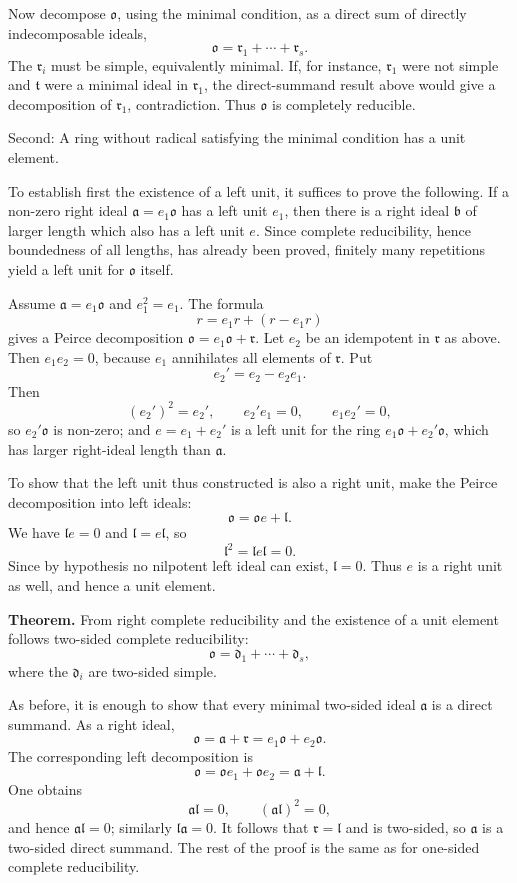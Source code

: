 \documentclass[11pt]{article}
\begin{document}
Now decompose \(\mathfrak{o}\), using the minimal condition, as a direct
sum of directly indecomposable ideals, \[
  \mathfrak{o}=\mathfrak r_1+\cdots+\mathfrak r_s.
\] The \(\mathfrak r_i\) must be simple, equivalently minimal. If, for
instance, \(\mathfrak r_1\) were not simple and \(\mathfrak t\) were a
minimal ideal in \(\mathfrak r_1\), the direct-summand result above
would give a decomposition of \(\mathfrak r_1\), contradiction. Thus
\(\mathfrak{o}\) is completely reducible.

Second: A ring without radical satisfying the minimal condition has a
unit element.

To establish first the existence of a left unit, it suffices to prove
the following. If a non-zero right ideal \(\mathfrak a=e_1\mathfrak{o}\)
has a left unit \(e_1\), then there is a right ideal \(\mathfrak b\) of
larger length which also has a left unit \(e\). Since complete
reducibility, hence boundedness of all lengths, has already been proved,
finitely many repetitions yield a left unit for \(\mathfrak{o}\) itself.

Assume \(\mathfrak a=e_1\mathfrak{o}\) and \(e_1^2=e_1\). The formula \[
  r=e_1r+(r-e_1r)
\] gives a Peirce decomposition
\(\mathfrak{o}=e_1\mathfrak{o}+\mathfrak r\). Let \(e_2\) be an
idempotent in \(\mathfrak r\) as above. Then \(e_1e_2=0\), because
\(e_1\) annihilates all elements of \(\mathfrak r\). Put \[
  e_2'=e_2-e_2e_1.
\] Then \[
  (e_2')^2=e_2',
  \qquad
  e_2'e_1=0,
  \qquad
  e_1e_2'=0,
\] so \(e_2'\mathfrak{o}\) is non-zero; and \(e=e_1+e_2'\) is a left
unit for the ring \(e_1\mathfrak{o}+e_2'\mathfrak{o}\), which has larger
right-ideal length than \(\mathfrak a\).

To show that the left unit thus constructed is also a right unit, make
the Peirce decomposition into left ideals: \[
  \mathfrak{o}=\mathfrak{o}e+\mathfrak l.
\] We have \(\mathfrak l e=0\) and \(\mathfrak l=e\mathfrak l\), so \[
  \mathfrak l^2=\mathfrak l e\mathfrak l=0.
\] Since by hypothesis no nilpotent left ideal can exist,
\(\mathfrak l=0\). Thus \(e\) is a right unit as well, and hence a unit
element.

\textbf{Theorem.} From right complete reducibility and the existence of
a unit element follows two-sided complete reducibility: \[
  \mathfrak{o}=\mathfrak d_1+\cdots+\mathfrak d_s,
\] where the \(\mathfrak d_i\) are two-sided simple.

As before, it is enough to show that every minimal two-sided ideal
\(\mathfrak a\) is a direct summand. As a right ideal, \[
  \mathfrak{o}=\mathfrak a+\mathfrak r=e_1\mathfrak{o}+e_2\mathfrak{o}.
\] The corresponding left decomposition is \[
  \mathfrak{o}=\mathfrak{o}e_1+\mathfrak{o}e_2=\mathfrak a+\mathfrak l.
\] One obtains \[
  \mathfrak a\mathfrak l=0,
  \qquad
  (\mathfrak a\mathfrak l)^2=0,
\] and hence \(\mathfrak a\mathfrak l=0\); similarly
\(\mathfrak l\mathfrak a=0\). It follows that
\(\mathfrak r=\mathfrak l\) and is two-sided, so \(\mathfrak a\) is a
two-sided direct summand. The rest of the proof is the same as for
one-sided complete reducibility.
\end{document}
